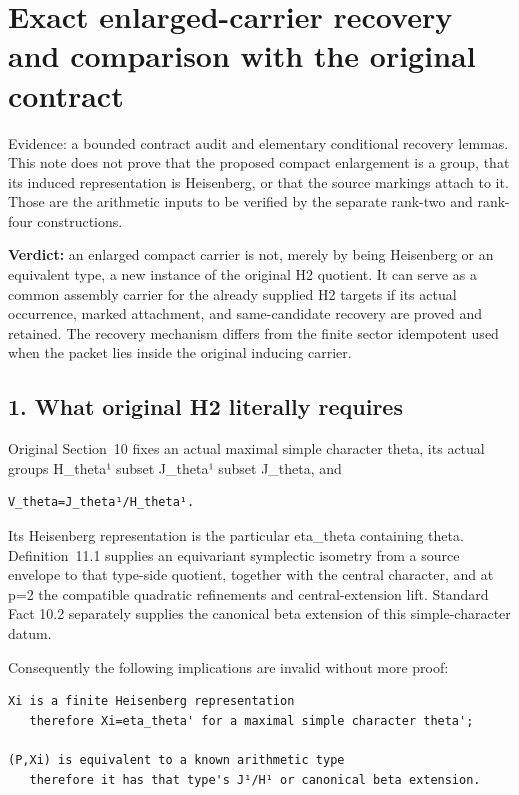 \clearpage
\section{Exact enlarged-carrier recovery and comparison with the original contract}\label{app:lowrank_contract}

Evidence: a bounded contract audit and elementary conditional recovery
lemmas. This note does not prove that the proposed compact enlargement
is a group, that its induced representation is Heisenberg, or that the
source markings attach to it. Those are the arithmetic inputs to be
verified by the separate rank-two and rank-four constructions.

\textbf{Verdict:} an enlarged compact carrier is not, merely by being
Heisenberg or an equivalent type, a new instance of the original H2
quotient. It can serve as a common assembly carrier for the already
supplied H2 targets if its actual occurrence, marked attachment, and
same-candidate recovery are proved and retained. The recovery mechanism
differs from the finite sector idempotent used when the packet lies
inside the original inducing carrier.

\hypertarget{lowrank_contract-what-original-h2-literally-requires}{%
\subsection{1. What original H2 literally
requires}\label{lowrank_contract-what-original-h2-literally-requires}}

Original Section~10 fixes an actual maximal simple character theta, its
actual groups H\_theta¹ subset J\_theta¹ subset J\_theta, and

\begin{Verbatim}[fontsize=\small,breaklines=true,breakanywhere=true]
V_theta=J_theta¹/H_theta¹.
\end{Verbatim}

Its Heisenberg representation is the particular eta\_theta containing
theta. Definition~11.1 supplies an equivariant symplectic isometry from a
source envelope to that type-side quotient, together with the central
character, and at p=2 the compatible quadratic refinements and
central-extension lift. Standard Fact 10.2 separately supplies the
canonical beta extension of this simple-character datum.

Consequently the following implications are invalid without more proof:

\begin{Verbatim}[fontsize=\small,breaklines=true,breakanywhere=true]
Xi is a finite Heisenberg representation
   therefore Xi=eta_theta' for a maximal simple character theta';

(P,Xi) is equivalent to a known arithmetic type
   therefore it has that type's J¹/H¹ or canonical beta extension.
\end{Verbatim}

